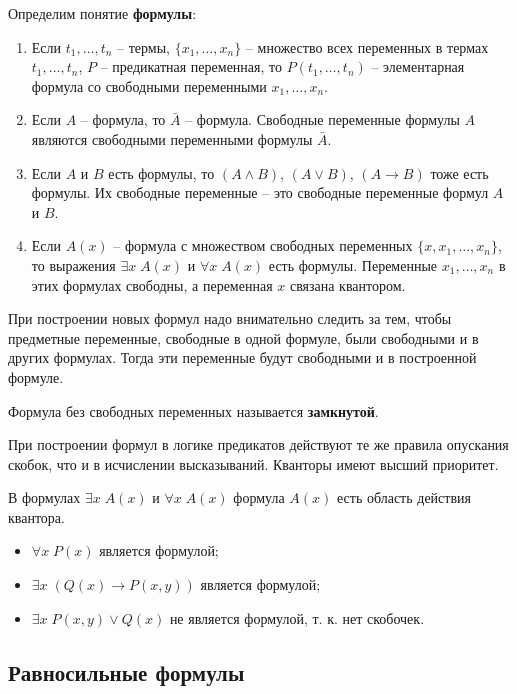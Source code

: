 \noindent Определим понятие \textbf{формулы}:
\begin{enumerate}
    \item Если \(t_1, \ldots, t_n\) -- термы, \(\{x_1, \ldots, x_n\}\) -- множество всех переменных в термах \(t_1, \ldots, t_n\), \(P\) -- предикатная переменная, то \(P(t_1, \ldots, t_n)\) -- элементарная формула со свободными переменными \(x_1, \ldots, x_n\).
    \item Если \(A\) -- формула, то \(\bar{A}\) -- формула. Свободные переменные формулы \(A\) являются свободными переменными формулы \(\bar{A}\).
    \item Если \(A\) и \(B\) есть формулы, то \((A \land B)\), \((A \lor B)\), \((A \to B)\) тоже есть формулы. Их свободные переменные -- это свободные переменные формул \(A\) и \(B\).
    \item Если \(A(x)\) -- формула с множеством свободных переменных \(\{x, x_1, \ldots, x_n\}\), то выражения \(\exists x \; A(x)\) и \(\forall x \; A(x)\) есть формулы. Переменные \(x_1, \ldots, x_n\) в этих формулах свободны, а переменная \(x\) связана квантором.
\end{enumerate}

При построении новых формул надо внимательно следить за тем, чтобы предметные переменные, свободные в одной формуле, были свободными и в других формулах. Тогда эти переменные будут свободными и в построенной формуле.

Формула без свободных переменных называется \textbf{замкнутой}.

При построении формул в логике предикатов действуют те же правила опускания скобок, что и в исчислении высказываний. Кванторы имеют высший приоритет.

В формулах \(\exists x \; A(x)\) и \(\forall x \; A(x)\) формула \(A(x)\) есть область действия квантора.

\begin{example*}
    \newpar
    \begin{itemize}
        \item \(\forall x \; P(x)\) является формулой;
        \item \(\exists x \; (Q(x) \to P(x, y))\) является формулой;
        \item \(\exists x \; P(x, y) \lor Q(x)\) не является формулой, т. к. нет скобочек.
    \end{itemize}
\end{example*}

\subsection{Равносильные формулы}

